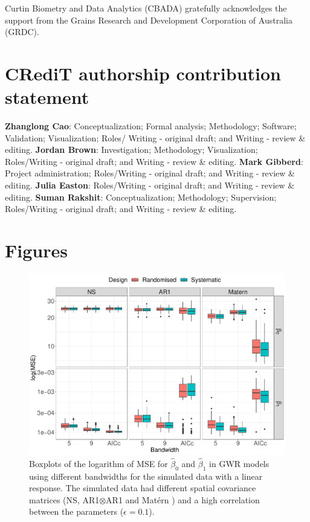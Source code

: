 \documentclass[a4paper]{article} 	%
\newcommand{\Matern}{Mat\'ern }
\begin{document}
Curtin Biometry and Data Analytics (CBADA) gratefully acknowledges the support from the Grains Research and Development Corporation of Australia (GRDC).

\section*{CRediT authorship contribution statement}

\textbf{Zhanglong Cao}: Conceptualization; Formal analysis; Methodology; Software; Validation; Visualization; Roles/ Writing - original draft; and Writing - review \& editing. \textbf{Jordan Brown}: Investigation; Methodology; Visualization; Roles/Writing - original draft; and Writing - review \& editing. \textbf{Mark Gibberd}: Project administration; Roles/Writing - original draft; and Writing - review \& editing. \textbf{Julia Easton}: Roles/Writing - original draft; and Writing - review \& editing. \textbf{Suman Rakshit}: Conceptualization; Methodology; Supervision; Roles/Writing - original draft; and Writing - review \& editing. 


\appendix

\section{Figures}

\begin{figure}[H]
	\centering
	\includegraphics[width=\linewidth]{Expt/Col_LinCombMSE_newpar_eta01.pdf}
	\caption{Boxplots of the logarithm of MSE for $\hat{\beta}_0$ and $\hat{\beta}_1$ in GWR models using different bandwidths for the simulated data with a linear response. The simulated data had different spatial covariance matrices (NS, AR1$\otimes$AR1 and \Matern) and a high correlation between the parameters ($\epsilon=0.1$).}\label{fig:LinBetaMSEeta01}
\end{figure}
\end{document}
